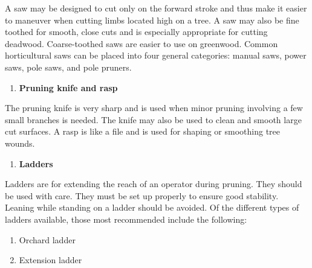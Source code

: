 \documentclass[
]{article}
\providecommand{\tightlist}{%
  \setlength{\itemsep}{0pt}\setlength{\parskip}{0pt}}
\begin{document}
A saw may be designed to cut only on the forward stroke and thus make it easier to maneuver when cutting limbs located high on a tree. A saw may also be fine toothed for smooth, close cuts and is especially appropriate for cutting deadwood. Coarse-toothed saws are easier to use on greenwood. Common horticultural saws can be placed into four general categories: manual saws, power saws, pole saws, and pole pruners.

\begin{enumerate}
\def\labelenumi{\arabic{enumi}.}
\setcounter{enumi}{2}
\tightlist
\item
  \textbf{Pruning knife and rasp}
\end{enumerate}

The pruning knife is very sharp and is used when minor pruning involving a few small branches is needed. The knife may also be used to clean and smooth large cut surfaces. A rasp is like a file and is used for shaping or smoothing tree wounds.

\begin{enumerate}
\def\labelenumi{\arabic{enumi}.}
\setcounter{enumi}{3}
\tightlist
\item
  \textbf{Ladders}
\end{enumerate}

Ladders are for extending the reach of an operator during pruning. They should be used with care. They must be set up properly to ensure good stability. Leaning while standing on a ladder should be avoided. Of the different types of ladders available, those most recommended include the following:

\begin{enumerate}
\def\labelenumi{\arabic{enumi}.}
\tightlist
\item
  Orchard ladder
\item
  Extension ladder
\end{enumerate}
\end{document}
